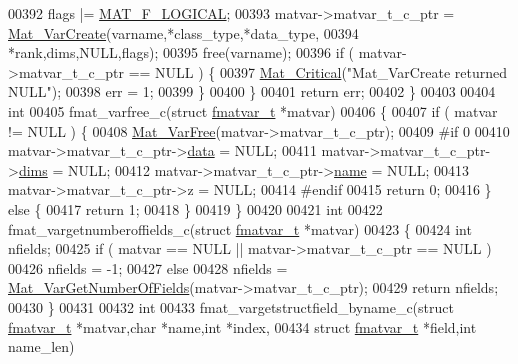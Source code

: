 \begin{DoxyCode}
{{00392             flags |= \hyperlink{group___m_a_t_ggab9d6ef9e3ddca78a317b173f01d53fbba57eb5c6e200bcbc0f1b7982f29a169c2}{MAT\_F\_LOGICAL};
00393         matvar->matvar\_t\_c\_ptr = \hyperlink{group___m_a_t_ga1c54a84bb4d810c6fccdb8869489eac4}{Mat\_VarCreate}(varname,*class\_type,*data\_type,
00394                                                *rank,dims,NULL,flags);
00395         free(varname);
00396         \textcolor{keywordflow}{if} ( matvar->matvar\_t\_c\_ptr == NULL ) \{
00397             \hyperlink{group__mat__util_gaf51f2bfbb5580f575e4dd79757e2b80c}{Mat\_Critical}(\textcolor{stringliteral}{"Mat\_VarCreate returned NULL"});
00398             err = 1;
00399         \}
00400     \}
00401     \textcolor{keywordflow}{return} err;
00402 \}
00403 
00404 \textcolor{keywordtype}{int}
00405 fmat\_varfree\_c(\textcolor{keyword}{struct} \hyperlink{structfmatvar__t}{fmatvar\_t} *matvar)
00406 \{
00407     \textcolor{keywordflow}{if} ( matvar != NULL ) \{
00408         \hyperlink{group___m_a_t_ga1d14716f7450530fd1c9d02413787f0e}{Mat\_VarFree}(matvar->matvar\_t\_c\_ptr);
00409 \textcolor{preprocessor}{#if 0}
00410         matvar->matvar\_t\_c\_ptr->\hyperlink{group___m_a_t_a5672978efa230bbdecdf38ede781f7fa}{data} = NULL;
00411         matvar->matvar\_t\_c\_ptr->\hyperlink{group___m_a_t_a8e01234e1c862ce3472bb37f5a09b92c}{dims} = NULL;
00412         matvar->matvar\_t\_c\_ptr->\hyperlink{group___m_a_t_a5d4b55b041e3b4fb50c04337f05ad909}{name} = NULL;
00413         matvar->matvar\_t\_c\_ptr->z    = NULL;
00414 \textcolor{preprocessor}{#endif}
00415         \textcolor{keywordflow}{return} 0;
00416     \} \textcolor{keywordflow}{else} \{
00417         \textcolor{keywordflow}{return} 1;
00418     \}
00419 \}
00420 
00421 \textcolor{keywordtype}{int}
00422 fmat\_vargetnumberoffields\_c(\textcolor{keyword}{struct} \hyperlink{structfmatvar__t}{fmatvar\_t} *matvar)
00423 \{
00424     \textcolor{keywordtype}{int} nfields;
00425     \textcolor{keywordflow}{if} ( matvar == NULL || matvar->matvar\_t\_c\_ptr == NULL )
00426         nfields = -1;
00427     \textcolor{keywordflow}{else}
00428         nfields = \hyperlink{group___m_a_t_ga06ba20aa758543d53dc83a1ccbdc2efc}{Mat\_VarGetNumberOfFields}(matvar->matvar\_t\_c\_ptr);
00429     \textcolor{keywordflow}{return} nfields;
00430 \}
00431 
00432 \textcolor{keywordtype}{int}
00433 fmat\_vargetstructfield\_byname\_c(\textcolor{keyword}{struct} \hyperlink{structfmatvar__t}{fmatvar\_t} *matvar,\textcolor{keywordtype}{char} *name,\textcolor{keywordtype}{int} *index,
00434     \textcolor{keyword}{struct} \hyperlink{structfmatvar__t}{fmatvar\_t} *field,\textcolor{keywordtype}{int} name\_len)
}}
\end{DoxyCode}
